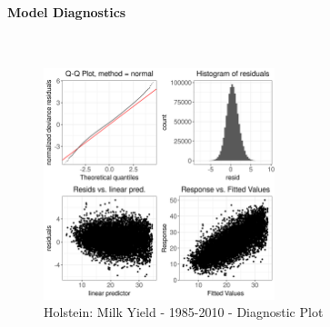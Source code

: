 \paragraph{Model Diagnostics} \quad \\
\begin{figure}[H]
    \centering
    \includegraphics[width=0.6\textwidth]{thesis/figures/models/milk/before2010/ho_milk_before2010/ho_milk_before2010_diagnostics.png}
    \caption[]{Holstein: Milk Yield - 1985-2010 - Diagnostic Plot}
\end{figure}

\newpage
